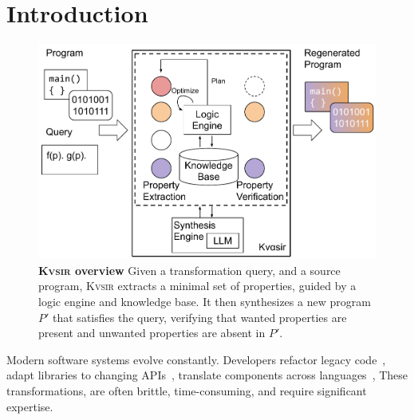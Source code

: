 \documentclass[sigplan,review,anonymous,10pt]{acmart}
\newcommand{\sys}{{\scshape Kv{\textalpha}sir}\xspace}
\begin{document}
\section{Introduction}
\begin{figure}[t]
  \includegraphics[width=.9\columnwidth]{figs/kvasir_overview.pdf}
  \caption{\textbf{\sys overview}
Given a transformation query, and a source program, \sys extracts a minimal set
  of properties,
  guided by a logic engine and knowledge base.
  It then synthesizes a new program $P'$ that satisfies the query, verifying
  that wanted properties are present and unwanted properties are absent in $P'$.
}
  \label{fig:overview}
\end{figure}





Modern software systems evolve constantly.
Developers refactor legacy code~\cite{Fowler99,Mens04,facebook2010redesigns,dropbox2014syncengine},
adapt libraries to changing APIs~\cite{dig2005role,kula2017empiricalstudyimpactrefactoring},
translate components across languages~\cite{manzoor_cli_python,gaultier_rewrite_cpp},
These transformations, are often brittle, time-consuming, and require significant expertise.
\end{document}
